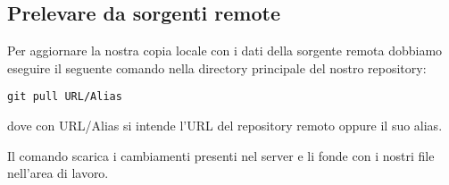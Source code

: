 \subsection{Prelevare da sorgenti remote}
Per aggiornare la nostra copia locale con i dati della sorgente remota dobbiamo eseguire il seguente comando nella directory principale del nostro repository:

\begin{center}
\texttt{git pull URL/Alias}
\end{center}

dove con URL/Alias si intende l'URL del repository remoto oppure il suo alias.

Il comando scarica i cambiamenti presenti nel server e li fonde con i nostri file nell'area di lavoro.
